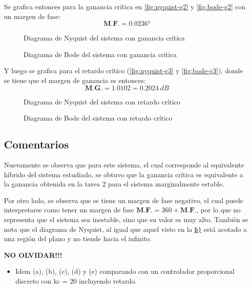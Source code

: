 Se grafica entonces para la ganancia crítica en \autoref{fig:nyquist-g2} y \autoref{fig:bode-g2}
con un margen de fase:
\begin{equation}
  \boxed{\textbf{M.F.} = \ang{0.0236}}
\end{equation}

\begin{figure}[h]
  \centering
  
  \caption{Diagrama de Nyquist del sistema con ganancia crítica}
  \label{fig:nyquist-g2}
\end{figure}

\begin{figure}[h]
  \centering
  
  \caption{Diagrama de Bode del sistema con ganancia crítica}
  \label{fig:bode-g2}
\end{figure}

Y luego se grafica para el retardo crítico (\autoref{fig:nyquist-g3} y
\autoref{fig:bode-g3}), donde se tiene que el margen de ganancia es entonces:
\begin{equation}
  \boxed{\textbf{M.G.} = 1.0102 = 0.2024\ \unit{dB}}
\end{equation}

\begin{figure}[h]
  \centering
  
  \caption{Diagrama de Nyquist del sistema con retardo crítico}
  \label{fig:nyquist-g3}
\end{figure}

\begin{figure}[h]
  \centering
  
  \caption{Diagrama de Bode del sistema con retardo crítico}
  \label{fig:bode-g3}
\end{figure}

\FloatBarrier
\subsection{Comentarios}

Nuevamente se observa que para este sistema, el cual corresponde al equivalente híbrido
del sistema estudiado, se obtuvo que la ganancia crítica es equivalente a la ganancia
obtenida en la tarea 2 \cite{tarea-2-sdc} para el sistema marginalmente estable.

Por otro lado, se observa que se tiene un margen de fase negativo, el cual puede
interpretarse como tener un margen de fase $\textbf{M.F.} = 360 + \textbf{M.F.}$,
por lo que no representa que el sistema sea inestable, sino que su valor es muy
alto. También se nota que el diagrama de Nyquist, al igual que aquel visto en la
\hyperref[pregunta-b]{\texttt{b)}} está acotado a una región del plano y no tiende
hacia el infinito.

\textbf{NO OLVIDAR!!!}


\begin{itemize}
  \item Idem (a), (b), (c), (d) y (e) comparando con un controlador proporcional discreto con kc = 20 incluyendo retardo.
\end{itemize}


